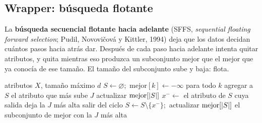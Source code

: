 \documentclass[11pt,letterpaper]{article}
\begin{document}

\subsection*{Wrapper: búsqueda flotante}

La \textbf{búsqueda secuencial flotante hacia adelante} (SFFS,
\textit{sequential floating forward selection}; Pudil, Novovičová y
Kittler, 1994) deja que los datos decidan cuántos pasos hacia atrás dar.
Después de cada paso hacia adelante intenta quitar atributos, y quita
mientras eso produzca un subconjunto mejor que el mejor que ya conocía
de ese tamaño. El tamaño del subconjunto sube y baja: flota.

\begin{algorithm}[H]
\caption{Búsqueda flotante hacia adelante}
\begin{algorithmic}[1]
\Require atributos $X$, tamaño máximo $d$
\State $S \gets \varnothing$;\ $\text{mejor}[k] \gets -\infty$ para
       todo $k$
  \State agregar a $S$ el atributo que más sube $J$
  \State actualizar $\text{mejor}[\left\lvert S \right\rvert]$
   
    \State $x^- \gets$ el atributo de $S$ cuya salida deja la $J$ más
           alta
      \State salir del ciclo
    \EndIf
    \State $S \gets S \setminus \{x^-\}$;\ actualizar
           $\text{mejor}[\left\lvert S \right\rvert]$
  \EndWhile
\EndWhile
\State \Return el subconjunto de $\text{mejor}$ con la $J$ más alta
\end{algorithmic}
\end{algorithm}
\end{document}
